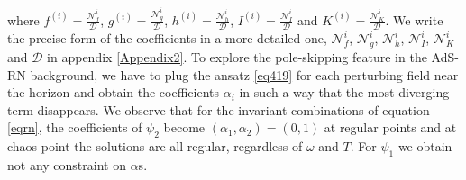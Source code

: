 \documentclass[preprintnumbers,aps,prd,longbibliography,nofootinbib,nobibnotes,amsmath,amssymb]{revtex4}
\begin{document}
where $f^{(i)} = \frac{\mathcal{N}_f^i}{\mathcal{D}}$, $g^{(i)} = \frac{\mathcal{N}_g^i}{\mathcal{D}}$, $h^{(i)} = \frac{\mathcal{N}_h^i}{\mathcal{D}}$, $ I^{(i)} = \frac{\mathcal{N}_I^i}{\mathcal{D}}$ and $K^{(i)} = \frac{\mathcal{N}_K^i}{\mathcal{D}}$. We write the precise form of the coefficients in a more detailed one,  $\mathcal{N}_f^i$, $\mathcal{N}_g^i$, $\mathcal{N}_h^i$, $\mathcal{N}_I^i$, $\mathcal{N}_K^i$ and $\mathcal{D}$ in  appendix \ref{Appendix2}. To explore the pole-skipping feature in the AdS-RN background, we have to plug the ansatz \eqref{eq419} for each perturbing field near the horizon and obtain the coefficients $\alpha_i$ in such a way that the most diverging term disappears. We observe that for the invariant combinations of equation \eqref{eqrn}, the coefficients of $\psi_2$ become $(\alpha_1, \alpha_2) = (0, 1)$ at regular points and at chaos point  the solutions are all regular, regardless of $\omega$ and $T$. For $\psi_1$ we  obtain not any constraint on $\alpha$s.
\end{document}
